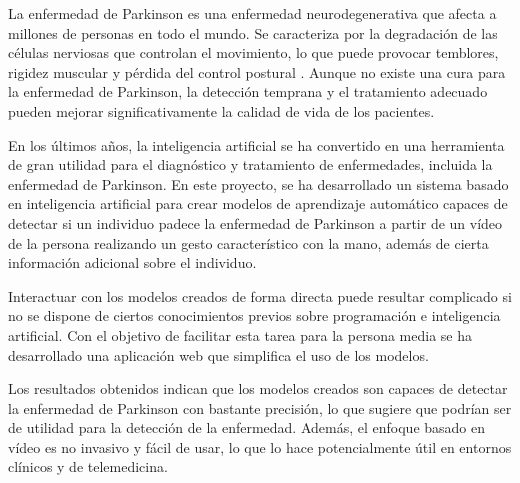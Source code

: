 \label{cha:Introducción}

La enfermedad de Parkinson es una enfermedad neurodegenerativa que afecta a
millones de personas en todo el mundo. Se caracteriza por la degradación de las
células nerviosas que controlan el movimiento, lo que puede provocar temblores,
rigidez muscular y pérdida del control postural \cite{eswiki:148845196}. Aunque
no existe una cura para la enfermedad de Parkinson, la detección temprana y el
tratamiento adecuado pueden mejorar significativamente la calidad de vida de los
pacientes.

En los últimos años, la inteligencia artificial se ha convertido en una
herramienta de gran utilidad para el diagnóstico y tratamiento de enfermedades,
incluida la enfermedad de Parkinson. En este proyecto, se ha desarrollado un
sistema basado en inteligencia artificial para crear modelos de aprendizaje
automático capaces de detectar si un individuo padece la enfermedad de Parkinson
a partir de un vídeo de la persona realizando un gesto característico con la
mano, además de cierta información adicional sobre el individuo.

Interactuar con los modelos creados de forma directa puede resultar complicado
si no se dispone de ciertos conocimientos previos sobre programación e
inteligencia artificial. Con el objetivo de facilitar esta tarea para la persona
media se ha desarrollado una aplicación web que simplifica el uso de los
modelos.

Los resultados obtenidos indican que los modelos creados son capaces de detectar
la enfermedad de Parkinson con bastante precisión, lo que sugiere que podrían
ser de utilidad para la detección de la enfermedad. Además, el enfoque basado en
vídeo es no invasivo y fácil de usar, lo que lo hace potencialmente útil en
entornos clínicos y de telemedicina.
